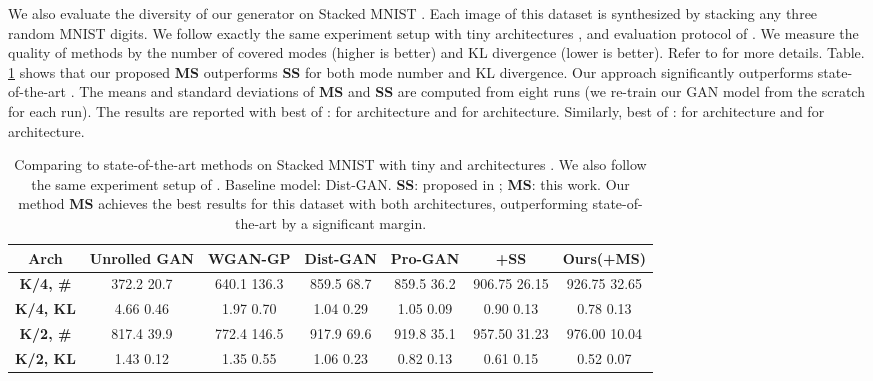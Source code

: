 \documentclass{article}
\begin{document}
We also evaluate the diversity of our generator on Stacked MNIST \cite{metz-arxiv-2016}. Each image of this dataset is synthesized by stacking any three random MNIST digits. We follow exactly the same experiment setup with tiny architectures ,  and evaluation protocol of \cite{metz-arxiv-2016}. We measure the quality of methods by the number of covered modes (higher is better) and KL divergence (lower is better). Refer to \cite{metz-arxiv-2016} for more details. Table. \ref{new_experiments_stacked_mnist} shows that our proposed \textbf{MS} outperforms \textbf{SS} for both mode number and KL divergence. Our approach  significantly outperforms state-of-the-art \cite{tran-eccv-2018,karras-iclr-2018}. The means and standard deviations of \textbf{MS} and \textbf{SS} are computed from eight runs (we re-train our GAN model from the scratch for each run). The results are reported with best  of :  for  architecture and  for  architecture. Similarly, best  of :  for  architecture and  for  architecture.

\begin{table}
    \centering
    \scriptsize
    \caption{Comparing to state-of-the-art methods on Stacked MNIST with tiny  and  architectures \cite{metz-arxiv-2016}. We also follow the same experiment setup of \cite{metz-arxiv-2016}. Baseline model: Dist-GAN. {\bf SS}: proposed in \cite{chen-arxiv-2018}; {\bf MS}: this work. Our method {\bf MS} achieves the best results for this dataset with both architectures, outperforming state-of-the-art \cite{tran-eccv-2018,karras-iclr-2018} by a significant margin.}
    \begin{tabular}{ c  c  c  c  c  c  c }
    \toprule
    \textbf{Arch} & \textbf{Unrolled GAN \cite{metz-arxiv-2016}} & \textbf{WGAN-GP \cite{gulrajani-arxiv-2017}} & \textbf{Dist-GAN \cite{tran-eccv-2018}} & \textbf{Pro-GAN \cite{karras-iclr-2018}} & \textbf{\cite{tran-eccv-2018}+SS} & \textbf{Ours(\cite{tran-eccv-2018}+MS)}\\ 
    \hline
    \textbf{K/4, \#} & 372.2  20.7 & 640.1  136.3 & 859.5  68.7 & 859.5  36.2 & 906.75  26.15 & 926.75  32.65 \\ 
    \textbf{K/4, KL} & 4.66  0.46 & 1.97  0.70 & 1.04  0.29 & 1.05  0.09 & 0.90  0.13 & 0.78  0.13\\
    \hline
    \textbf{K/2, \#} & 817.4  39.9 & 772.4  146.5 & 917.9  69.6 & 919.8  35.1 & 957.50  31.23 & 976.00  10.04\\ 
    \textbf{K/2, KL} & 1.43  0.12 & 1.35  0.55  & 1.06  0.23 & 0.82  0.13 & 0.61  0.15 & 0.52  0.07\\
    \bottomrule
    \end{tabular}
    \label{new_experiments_stacked_mnist}
    \vspace{-0.4cm}
\end{table}
\end{document}
